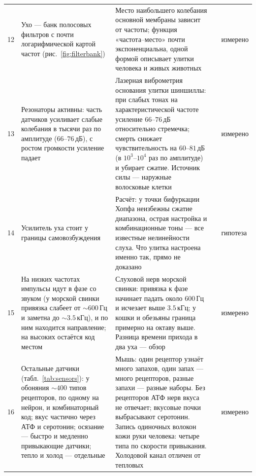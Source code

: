 {\begin{longtable}{>{\raggedright}p{0.5cm}>{\raggedright}p{4.0cm}>{\raggedright}p{5.6cm}>{\raggedright}p{2.3cm}>{\raggedright\arraybackslash}p{1.7cm}}
12 & Ухо --- банк полосовых фильтров с почти логарифмической картой частот (рис.~\ref{fig:filterbank}) & Место наибольшего колебания основной мембраны зависит от частоты; функция «частота--место» почти экспоненциальна, одной формой описывает улитки человека и живых животных & \cite{Greenwood1990,Robles2001} & измерено \\
13 & Резонаторы активны: часть датчиков усиливает слабые колебания в тысячи раз по амплитуде ($66$--$76$\,дБ), с ростом громкости усиление падает & Лазерная виброметрия основания улитки шиншиллы: при слабых тонах на характеристической частоте усиление $66$--$76$\,дБ относительно стремечка; смерть снижает чувствительность на $60$--$81$\,дБ (в $10^3$--$10^4$ раз по амплитуде) и убирает сжатие. Источник силы --- наружные волосковые клетки & \cite{Ruggero1997,Robles2001} & измерено \\
14 & Усилитель уха стоит у границы самовозбуждения & Расчёт: у точки бифуркации Хопфа неизбежны сжатие диапазона, острая настройка и комбинационные тоны --- все известные нелинейности слуха. Что улитка настроена именно так, прямо не доказано & \cite{Eguiluz2000} & гипотеза \\
15 & На низких частотах импульсы идут в фазе со звуком (у морской свинки привязка слабеет от $\sim600$\,Гц и заметна до $\sim3.5$\,кГц), и по ним находится направление; на высоких остаётся код местом & Слуховой нерв морской свинки: привязка к фазе начинает падать около $600$\,Гц и исчезает выше $3.5$\,кГц; у кошки и обезьяны граница примерно на октаву выше. Разница времени прихода в два уха --- обзор & \cite{PalmerRussell1986,Grothe2010} & измерено \\
16 & Остальные датчики (табл.~\ref{tab:sensors}): у обоняния $\sim400$ типов рецепторов, по одному на нейрон, и комбинаторный код; вкус частично через АТФ и серотонин; осязание --- быстро и медленно привыкающие датчики; тепло и холод --- отдельные & Мышь: один рецептор узнаёт много запахов, один запах --- много рецепторов, разные запахи --- разные наборы. Без рецепторов АТФ нерв вкуса не отвечает; вкусовые почки выбрасывают серотонин. Запись одиночных волокон кожи руки человека: четыре типа по скорости привыкания. Холодовой канал отличен от тепловых & \cite{Mombaerts2004,Malnic1999,Finger2005,Huang2005,JohanssonVallbo1979,McKemy2002} & измерено \\
\bottomrule
\end{longtable}}
